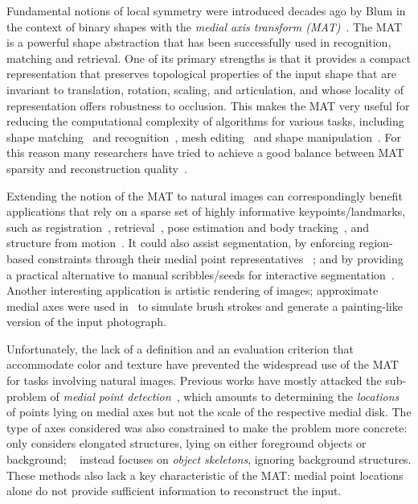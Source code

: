 \documentclass[10pt,twocolumn,letterpaper]{article}
\begin{document}
Fundamental notions of local symmetry were introduced decades ago by Blum in the context 
of binary shapes with the \emph{medial axis transform (MAT)}~\cite{blum1967transformation,blum1973biological}.
The MAT is a powerful shape abstraction that has been successfully used in recognition, matching and retrieval. 
One of its primary strengths is that it provides a compact representation that preserves topological
properties of the input shape that are invariant to translation, rotation, scaling, and articulation, 
and whose locality of representation offers robustness to occlusion.
This makes the MAT very useful for reducing the computational complexity of algorithms for various tasks,
including shape matching~\cite{siddiqi1999shock} and recognition~\cite{sebastian2001recognition},
mesh editing~\cite{li2001decomposing,yoshizawa2003free} and shape manipulation~\cite{du2004medial}.
For this reason many researchers have tried to achieve a good balance
between MAT sparsity and reconstruction quality~\cite{tam2003shape,li2015q}.

Extending the notion of the MAT to natural images can correspondingly benefit applications that rely on
a sparse set of highly informative keypoints/landmarks, such as registration~\cite{zhou2016estimating}, 
retrieval~\cite{sivic2003video}, pose estimation and body tracking~\cite{shotton2013efficient},
and structure from motion~\cite{agarwal2011building}.
It could also assist segmentation, by enforcing region-based constraints through their medial point representatives
~\cite{teo2015detection}; and by providing a practical alternative to manual 
scribbles/seeds for interactive segmentation~\cite{boykov2001interactive,price2010geodesic,isack2016hedgehog,lin2016scribblesup}.
Another interesting application is artistic rendering of images; approximate medial axes were used in~\cite{gooch2002artistic}
to simulate brush strokes and generate a painting-like version of the input photograph.

Unfortunately, the lack of a definition and an evaluation criterion 
that accommodate color and texture have prevented the widespread use of the MAT for tasks involving natural images.
Previous works have mostly attacked the sub-problem of \emph{medial point detection}~\cite{tsogkas2012learning,shen2016object},
which amounts to determining the \emph{locations} of points lying on medial axes 
but not the scale of the respective medial disk.
The type of axes considered was also constrained to make the problem more concrete:
\cite{tsogkas2012learning} only considers elongated structures, lying on either foreground objects or background; 
~\cite{shen2016object} instead focuses on \emph{object skeletons}, ignoring background structures.
These methods also lack a key characteristic of the MAT: medial point locations alone do not provide sufficient
information to reconstruct the input.
\end{document}
